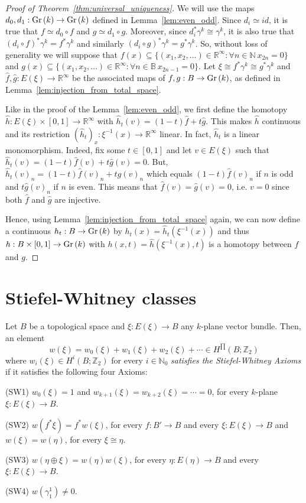 \begin{proof}[Proof of Theorem~\ref{thm:universal_uniqueness}] We will use the maps $d_0,d_1:\Gr{k}\to\Gr{k}$ defined in Lemma~\ref{lem:even_odd}. Since $d_i\simeq id$, it is true that $f\simeq d_0\circ f$ and $g\simeq d_1\circ g$. Moreover, since $d_i^*\gamma^k\cong\gamma^k$, it is also true that $(d_i\circ f)^*\gamma^k=f^*\gamma^k$ and similarly $(d_i\circ g)^*\gamma^k=g^*\gamma^k$. So, without loss of generality we will suppose that $f(x)\subseteq\{(x_1,x_2,\ldots)\in\mathbb{R}^{\infty}:\forall n\in\mathbb{N}\ x_{2n}=0\}$ and $g(x)\subseteq\{(x_1,x_2,\ldots)\in\mathbb{R}^{\infty}:\forall n\in\mathbb{B}\ x_{2n-1}=0\}$. Let $\xi\cong f^*\gamma^k\cong g^*\gamma^k$ and $\hat{f},\hat{g}:E(\xi)\to\mathbb{R}^{\infty}$ be the associated maps of $f,g:B\to\Gr{k}$, as defined in Lemma~\ref{lem:injection_from_total_space}.

Like in the proof of the Lemma~\ref{lem:even_odd}, we first define the homotopy $\hat{h}:E(\xi)\times[0,1]\to\mathbb{R}^{\infty}$ with $\hat{h}_t(v)=(1-t)\hat{f}+t\hat{g}$. This makes $\hat{h}$ continuous and its restriction $(\hat{h}_t)_x:\xi^{-1}(x)\to\mathbb{R}^{\infty}$ linear. In fact, $\hat{h}_t$ is a linear monomorphism. Indeed, fix some $t\in[0,1]$ and let $v\in E(\xi)$ such that $\hat{h}_t(v)=(1-t)\hat{f}(v)+t\hat{g}(v)=0$. But, $\hat{h}_t(v)_n=(1-t)\hat{f}(v)_n+t\hat{g}(v)_n$ which equals $(1-t)\hat{f}(v)_n$ if $n$ is odd and $t\hat{g}(v)_n$ if $n$ is even. This means that $\hat{f}(v)=\hat{g}(v)=0$, i.e. $v=0$ since both $\hat{f}$ and $\hat{g}$ are injective.

Hence, using Lemma~\ref{lem:injection_from_total_space} again, we can now define a continuous $h_t:B\to\Gr{k}$ by $h_t(x)=\hat{h}_t(\xi^{-1}(x))$ and thus $h:B\times[0,1]\to\Gr{k}$ with $h(x,t)=\hat{h}(\xi^{-1}(x),t)$ is a homotopy between $f$ and $g$.
\end{proof}

\section{Stiefel-Whitney classes}
\begin{axioms} Let $B$ be a topological space and $\xi:E(\xi)\to B$ any $k$-plane vector bundle. Then, an element
\[w(\xi)=w_0(\xi)+w_1(\xi)+w_2(\xi)+\cdots\in H^{\prod}(B;\mathbb{Z}_2)\]
where $w_i(\xi)\in H^i(B;\mathbb{Z}_2)$ for every $i\in\mathbb{N}_0$ \emph{satisfies the Stiefel-Whitney Axioms} if it satisfies the following four Axioms:
\begin{b_item}
\item[(SW1)] $w_0(\xi)=1$ and $w_{k+1}(\xi)=w_{k+2}(\xi)=\cdots=0$, for every $k$-plane $\xi:E(\xi)\to B$.
\item[(SW2)] $w(f^*\xi)=f^*w(\xi)$, for every $f:B'\to B$ and every $\xi:E(\xi)\to B$ and\\[0.2em]
$w(\xi)=w(\eta)$, for every $\xi\cong\eta$.
\item[(SW3)] $w(\eta\oplus\xi)=w(\eta)w(\xi)$, for every $\eta:E(\eta)\to B$ and every $\xi:E(\xi)\to B$.
\item[(SW4)] $w(\gamma_1^1)\neq0$.
\end{b_item}
\end{axioms}

